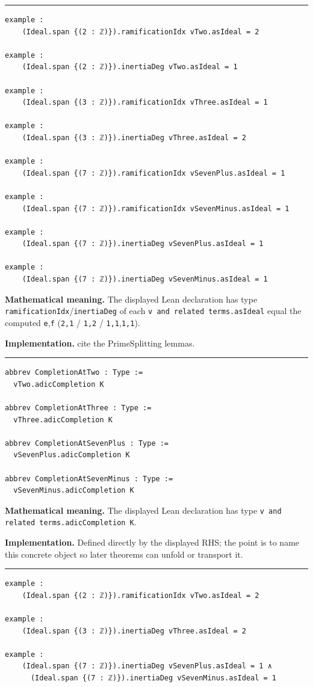 \documentclass[UTF8,a4paper,11pt,fontset=fandol]{ctexart}
\theoremstyle{definition}
\newcommand{\statementsep}{\par\medskip\hrule\medskip}
\begin{document}
\statementsep
\begin{verbatim}
example :
    (Ideal.span {(2 : ℤ)}).ramificationIdx vTwo.asIdeal = 2

example :
    (Ideal.span {(2 : ℤ)}).inertiaDeg vTwo.asIdeal = 1

example :
    (Ideal.span {(3 : ℤ)}).ramificationIdx vThree.asIdeal = 1

example :
    (Ideal.span {(3 : ℤ)}).inertiaDeg vThree.asIdeal = 2

example :
    (Ideal.span {(7 : ℤ)}).ramificationIdx vSevenPlus.asIdeal = 1

example :
    (Ideal.span {(7 : ℤ)}).ramificationIdx vSevenMinus.asIdeal = 1

example :
    (Ideal.span {(7 : ℤ)}).inertiaDeg vSevenPlus.asIdeal = 1

example :
    (Ideal.span {(7 : ℤ)}).inertiaDeg vSevenMinus.asIdeal = 1
\end{verbatim}
\noindent\textbf{Mathematical meaning.} The displayed Lean declaration has type \texttt{ramificationIdx}/\texttt{inertiaDeg} of each \texttt{v and related terms.\allowbreak{}asIdeal} equal the computed \texttt{e},\texttt{f} (\texttt{2,1} / \texttt{1,2} / \texttt{1,1},\texttt{1,1}).\par
\noindent\textbf{Implementation.} cite the PrimeSplitting lemmas.\par
\statementsep
\begin{verbatim}
abbrev CompletionAtTwo : Type :=
  vTwo.adicCompletion K

abbrev CompletionAtThree : Type :=
  vThree.adicCompletion K

abbrev CompletionAtSevenPlus : Type :=
  vSevenPlus.adicCompletion K

abbrev CompletionAtSevenMinus : Type :=
  vSevenMinus.adicCompletion K
\end{verbatim}
\noindent\textbf{Mathematical meaning.} The displayed Lean declaration has type \texttt{v and related terms.\allowbreak{}adicCompletion K}.\par
\noindent\textbf{Implementation.} Defined directly by the displayed RHS; the point is to name this concrete object so later theorems can unfold or transport it.\par
\statementsep
\begin{verbatim}
example :
    (Ideal.span {(2 : ℤ)}).ramificationIdx vTwo.asIdeal = 2

example :
    (Ideal.span {(3 : ℤ)}).inertiaDeg vThree.asIdeal = 2

example :
    (Ideal.span {(7 : ℤ)}).inertiaDeg vSevenPlus.asIdeal = 1 ∧
      (Ideal.span {(7 : ℤ)}).inertiaDeg vSevenMinus.asIdeal = 1
\end{verbatim}
\end{document}
